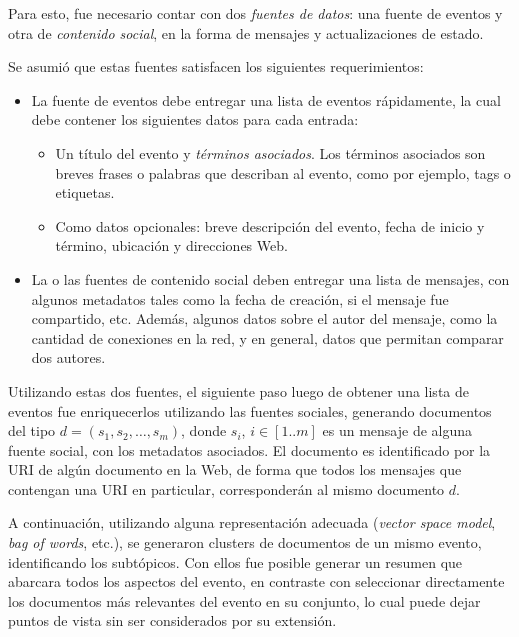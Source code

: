    Para esto, fue necesario contar con dos \emph{fuentes de datos}: una
   fuente de eventos y otra de \emph{contenido social}, en la forma de
   mensajes y actualizaciones de estado.

   Se asumió que estas fuentes satisfacen los siguientes
   requerimientos:

\begin{itemize}
\item La fuente de eventos debe entregar una lista de eventos
     rápidamente, la cual debe contener los siguientes datos para
     cada entrada:

\begin{itemize}
\item Un título del evento y \emph{términos asociados}. Los términos
       asociados son breves frases o palabras que describan al
       evento, como por ejemplo, tags o etiquetas.
\item Como datos opcionales: breve descripción del evento, fecha de
       inicio y término, ubicación y direcciones Web.
\end{itemize}

\item La o las fuentes de contenido social deben entregar una lista de
     mensajes, con algunos metadatos tales como la fecha de creación,
     si el mensaje fue compartido, etc. Además, algunos datos sobre el
     autor del mensaje, como la cantidad de conexiones en la red, y
     en general, datos que permitan comparar dos autores.
\end{itemize}
   Utilizando estas dos fuentes, el siguiente paso luego de obtener
   una lista de eventos fue enriquecerlos utilizando las fuentes
   sociales, generando documentos del tipo
   $d = (s_1, s_2, \ldots, s_m)$, donde  $s_i$, $i \in [1..m]$
   es un mensaje de alguna fuente social, con los
   metadatos asociados. El documento es identificado por la URI de
   algún documento en la Web, de forma que todos los mensajes que
   contengan una URI en particular, corresponderán al mismo documento
   $d$.

   A continuación, utilizando alguna representación adecuada
   (\emph{vector space model}, \emph{bag of words}, etc.), se generaron clusters
   de documentos de un mismo evento, identificando los subtópicos. Con
   ellos fue posible generar un resumen que abarcara todos los
   aspectos del evento, en contraste con seleccionar directamente los
   documentos más relevantes del evento en su conjunto, lo cual puede
   dejar puntos de vista sin ser considerados por su extensión.

